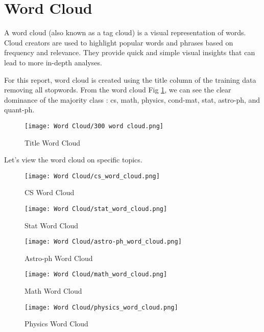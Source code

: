\section{Word Cloud}
A word cloud (also known as a tag cloud) is a visual representation of words. Cloud creators are used to highlight popular words and phrases based on frequency and relevance. They provide quick and simple visual insights that can lead to more in-depth analyses.

For this report, word cloud is created using the title column of the training data removing all stopwords. From the word cloud Fig \ref{fig:Title Corpus Word Cloud}, we can see the clear dominance of the majority class : cs, math, physics, cond-mat, stat, astro-ph, and quant-ph.

\begin{figure}[H]
    \centering
    \texttt{[image: Word Cloud/300 word cloud.png]}
    \caption{Title Word Cloud}
    \label{fig:Title Corpus Word Cloud}
\end{figure}

Let's view the word cloud on specific topics.

\begin{figure}[H]
    \centering
    \texttt{[image: Word Cloud/cs\_word\_cloud.png]}
    \caption{CS Word Cloud}
    \label{fig:cs Corpus Word Cloud}
\end{figure}

\begin{figure}[H]
    \centering
    \texttt{[image: Word Cloud/stat\_word\_cloud.png]}
    \caption{Stat Word Cloud}
    \label{fig:stat Corpus Word Cloud}
\end{figure}

\begin{figure}[H]
    \centering
    \texttt{[image: Word Cloud/astro-ph\_word\_cloud.png]}
    \caption{Astro-ph Word Cloud}
    \label{fig:astro-ph Corpus Word Cloud}
\end{figure}


\begin{figure}[H]
    \centering
    \texttt{[image: Word Cloud/math\_word\_cloud.png]}
    \caption{Math Word Cloud}
    \label{fig:math Corpus Word Cloud}
\end{figure}

\begin{figure}[H]
    \centering
    \texttt{[image: Word Cloud/physics\_word\_cloud.png]}
    \caption{Physics Word Cloud}
    \label{fig:physics Corpus Word Cloud}
\end{figure}

